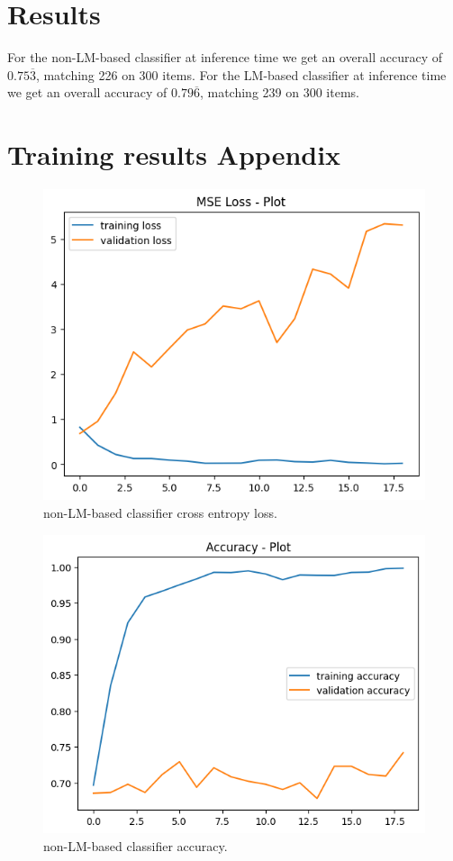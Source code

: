 \documentclass[11pt]{article}
\begin{document}
\section{Results}
For the non-LM-based classifier at inference time we get an overall accuracy of $0.75\overline{3}$, matching 226 on 300 items. For the LM-based classifier at inference time we get an overall accuracy of $0.79\overline{6}$, matching 239 on 300 items. 

\appendix
\section{Training results Appendix}
\label{sec:appendix1}

\begin{figure}
    \includegraphics[width=\linewidth]{loss-no-transformer.png}
    \caption{non-LM-based classifier cross entropy loss.}
    \label{fig:1}
\end{figure}
	
\begin{figure}
    \includegraphics[width=\linewidth]{accuracy-no-transformer.png}
    \caption{non-LM-based classifier accuracy.}
    \label{fig:2}
\end{figure}
	
\end{document}
